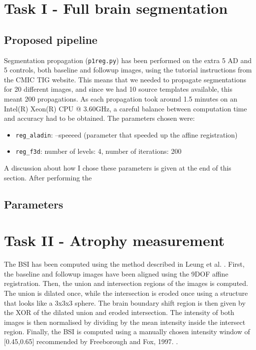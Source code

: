 \documentclass[11pt,a4paper,oneside]{report}
\begin{document}

\section*{Task I - Full brain segmentation}

\subsection*{Proposed pipeline}

Segmentation propagation (\texttt{p1reg.py}) has been performed on the extra 5 AD and 5 controls, both baseline and followup images, using the tutorial instructions from the CMIC TIG website. This means that we needed to propagate segmentations for 20 different images, and since we had 10 source templates available, this meant 200 propagations. As each propagation took around 1.5 minutes on an Intel(R) Xeon(R) CPU @ 3.60GHz, a careful balance between computation time and accuracy had to be obtained. The parameters chosen were: 
\begin{itemize}
 \item \texttt{reg\_aladin}: --speeeed (parameter that speeded up the affine registration)
 \item \texttt{reg\_f3d}: number of levels: 4, number of iterations: 200
\end{itemize}
A discussion about how I chose these parameters is given at the end of this section. After performing the 


\subsection*{Parameters}

\section*{Task II - Atrophy measurement}

The BSI has been computed using the method described in Leung et al. \cite{leung2010robust}. First, the baseline and followup images have been aligned using the 9DOF affine registration. Then, the union and intersection regions of the images is computed. The union is dilated once, while the intersection is eroded once using a structure that looks like a 3x3x3 sphere. The brain boundary shift region is then given by the XOR of the dilated union and eroded intersection. 
The intensity of both images is then normalised by dividing by the mean intensity inside the intersect region. Finally, the BSI is computed using a manually chosen intensity window of [0.45,0.65] recommended by Freeborough and Fox, 1997. \cite{freeborough1997boundary}.
\end{document}
